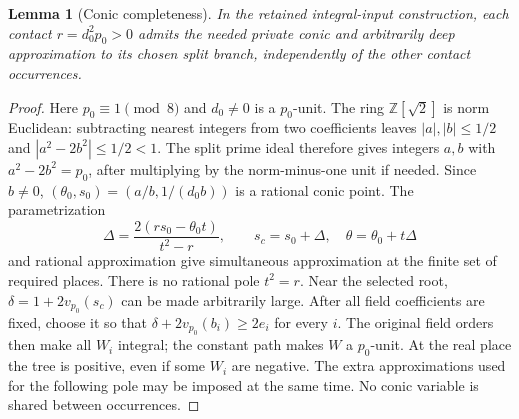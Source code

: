 \documentclass[11pt]{article}
\newtheorem{lemma}[theorem]{Lemma}
\theoremstyle{definition}
\theoremstyle{remark}
\newcommand{\Z}{\mathbb Z}
\begin{document}
\begin{lemma}[Conic completeness]\label{lem:quartic-conic-completeness}
In the retained integral-input construction, each contact
$r=d_0^2p_0>0$ admits the needed private conic and arbitrarily deep
approximation to its chosen split branch, independently of the other
contact occurrences.
\end{lemma}
\begin{proof}
Here $p_0\equiv1\pmod8$ and $d_0\ne0$ is a $p_0$-unit. The ring
$\Z[\sqrt2]$ is norm Euclidean: subtracting nearest integers from two
coefficients leaves $|a|,|b|\le1/2$ and $|a^2-2b^2|\le1/2<1$.
The split prime ideal therefore gives integers $a,b$ with $a^2-2b^2=p_0$,
after multiplying by the norm-minus-one unit if needed. Since $b\ne0$,
$(\theta_0,s_0)=(a/b,1/(d_0b))$ is a rational conic point. The parametrization
\[
 \Delta=\frac{2(rs_0-\theta_0 t)}{t^2-r},\qquad
 s_c=s_0+\Delta,\quad \theta=\theta_0+t\Delta
\]
and rational approximation give simultaneous approximation at the finite
set of required places. There is no rational pole $t^2=r$.
Near the selected root, $\delta=1+2v_{p_0}(s_c)$ can be made arbitrarily
large. After all field coefficients are fixed, choose it so that
$\delta+2v_{p_0}(b_i)\ge2e_i$ for every $i$. The original field orders
then make all $W_i$ integral; the constant path makes $W$ a $p_0$-unit.
At the real place the tree is positive, even if some $W_i$ are negative.
The extra approximations used for the following pole may be imposed at
the same time. No conic variable is shared between occurrences.
\end{proof}
\end{document}
